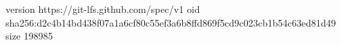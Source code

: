 version https://git-lfs.github.com/spec/v1
oid sha256:d2c4b14bd438f07a1a6cf80c55ef3a6b8ffd869f5cd9c023cb1b54c63ed81d49
size 198985
